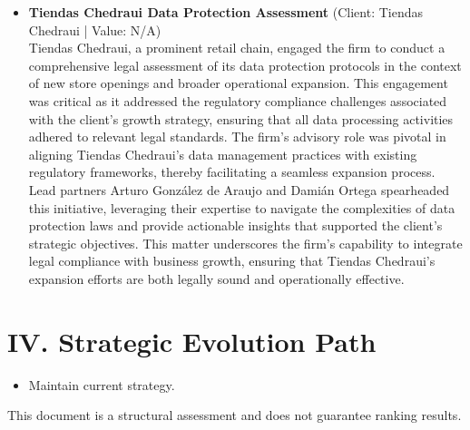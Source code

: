 \documentclass[11pt]{article}
\begin{document}
\begin{itemize}
\item \textbf{Tiendas Chedraui Data Protection Assessment} (Client: Tiendas Chedraui | Value: N/A)\\ Tiendas Chedraui, a prominent retail chain, engaged the firm to conduct a comprehensive legal assessment of its data protection protocols in the context of new store openings and broader operational expansion. This engagement was critical as it addressed the regulatory compliance challenges associated with the client's growth strategy, ensuring that all data processing activities adhered to relevant legal standards. The firm's advisory role was pivotal in aligning Tiendas Chedraui's data management practices with existing regulatory frameworks, thereby facilitating a seamless expansion process. Lead partners Arturo González de Araujo and Damián Ortega spearheaded this initiative, leveraging their expertise to navigate the complexities of data protection laws and provide actionable insights that supported the client's strategic objectives. This matter underscores the firm's capability to integrate legal compliance with business growth, ensuring that Tiendas Chedraui's expansion efforts are both legally sound and operationally effective.

\end{itemize}

\section*{IV. Strategic Evolution Path}
\begin{itemize}
\item Maintain current strategy.
\end{itemize}

\vfill
\centering
\small{This document is a structural assessment and does not guarantee ranking results.}
\end{document}
